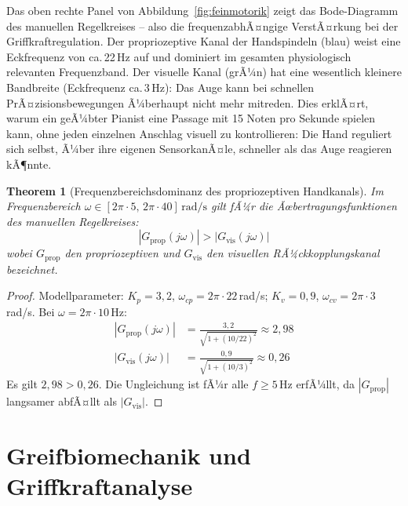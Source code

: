 ﻿\documentclass[12pt,a4paper]{report}
\theoremstyle{plain}
\newtheorem{theorem}{Theorem}[section]
\theoremstyle{definition}
\theoremstyle{remark}
\begin{document}
Das oben rechte Panel von Abbildung~\ref{fig:feinmotorik} zeigt das Bode-Diagramm
des manuellen Regelkreises -- also die frequenzabhÃ¤ngige VerstÃ¤rkung bei der
Griffkraftregulation. Der propriozeptive Kanal der Handspindeln (blau) weist
eine Eckfrequenz von ca.\,22\,Hz auf und dominiert im gesamten physiologisch
relevanten Frequenzband. Der visuelle Kanal (grÃ¼n) hat eine wesentlich kleinere
Bandbreite (Eckfrequenz ca.\,3\,Hz): Das Auge kann bei schnellen PrÃ¤zisionsbewegungen
Ã¼berhaupt nicht mehr mitreden. Dies erklÃ¤rt, warum ein geÃ¼bter Pianist eine
Passage mit 15 Noten pro Sekunde spielen kann, ohne jeden einzelnen Anschlag
visuell zu kontrollieren: Die Hand reguliert sich selbst, Ã¼ber ihre eigenen
SensorkanÃ¤le, schneller als das Auge reagieren kÃ¶nnte.

\begin{theorem}[Frequenzbereichsdominanz des propriozeptiven Handkanals]
\label{thm:bode}
Im Frequenzbereich $\omega \in [2\pi \cdot 5,\, 2\pi \cdot 40]\,\mathrm{rad/s}$
gilt fÃ¼r die Ãœbertragungsfunktionen des manuellen Regelkreises:
\[
  |G_{\text{prop}}(j\omega)| > |G_{\text{vis}}(j\omega)|
\]
wobei $G_{\text{prop}}$ den propriozeptiven und $G_{\text{vis}}$ den
visuellen RÃ¼ckkopplungskanal bezeichnet.
\end{theorem}

\begin{proof}
Modellparameter: $K_p = 3{,}2$, $\omega_{cp} = 2\pi \cdot 22$\,rad/s;
$K_v = 0{,}9$, $\omega_{cv} = 2\pi \cdot 3$\,rad/s. Bei $\omega = 2\pi \cdot 10$\,Hz:
\begin{align*}
  |G_{\text{prop}}(j\omega)| &= \frac{3{,}2}{\sqrt{1 + (10/22)^2}} \approx 2{,}98\\
  |G_{\text{vis}}(j\omega)|  &= \frac{0{,}9}{\sqrt{1 + (10/3)^2}}  \approx 0{,}26
\end{align*}
Es gilt $2{,}98 > 0{,}26$. Die Ungleichung ist fÃ¼r alle $f \geq 5$\,Hz erfÃ¼llt,
da $|G_{\text{prop}}|$ langsamer abfÃ¤llt als $|G_{\text{vis}}|$.
\end{proof}

\chapter{Greifbiomechanik und Griffkraftanalyse}
\label{chap:greif}
\end{document}
